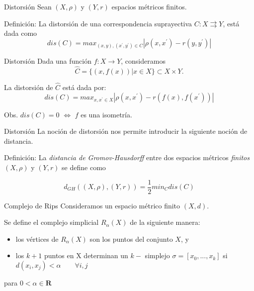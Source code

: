 \documentclass{beamer}
\begin{document}
\begin{frame}{Distorsión}
    Sean $(X, \rho)$ y $(Y, r)$ espacios métricos finitos.
    \begin{block}{Definición:}
        La distorsión de una correspondencia suprayectiva $C: X \rightrightarrows Y$, está dada como 
        $$dis(C) = max_{(x,y), (x^{'}, y^{'}) \in C}| \rho(x,x^{'}) - r(y, y^{'})|$$ 
    \end{block}
\end{frame}

\begin{frame}{Distorsión}
    Dada una función $f:X\to Y$, consideramos 
    $$\hat{C}=\{(x, f(x))| x\in X\}\subset X\times Y.$$
    \pause
    
    La distorsión de $\hat{C}$ está dada por: 
    $$dis(C) = max_{x, x^{'} \in X} | \rho(x,x^{'}) - r(f(x), f(x^{'}))|$$ 
    \pause

    \begin{block}{Obs.}
        $dis(C)=0$ $\Leftrightarrow$ $f$ es una isometría.
    \end{block}    
\end{frame}

\begin{frame}{Distorsión}
    La noción de distorsión nos permite introducir la siguiente noción de distancia.
    \pause 

    \begin{block}{Definición:}
        La \textit{distancia de Gromov-Hausdorff} entre dos espacios métricos \textit{finitos} $(X, \rho)$ y $(Y, r)$ se define como

        $$ d_{GH}((X, \rho), (Y, r)) = \frac{1}{2}min_{C}dis(C)$$
    \end{block}
\end{frame}

\begin{frame}{Complejo de Rips}
    Consideramos un espacio métrico finito $(X, d)$. 

    Se define el complejo simplicial $R_{\alpha}(X)$ de la siguiente manera: 
    \begin{itemize}
        \item los vértices de $R_{\alpha}(X)$ son los puntos del conjunto $X$, y  
        \pause
        \item los $k+1$ puntos en X determinan un $k-$ simplejo $\sigma = [x_{0},...,x_{k}]$ si $d(x_{i}, x_{j})< \alpha \qquad \forall i, j$
    \end{itemize}
    para $0 < \alpha\in \mathbf{R}$  
\end{frame}
\end{document}
